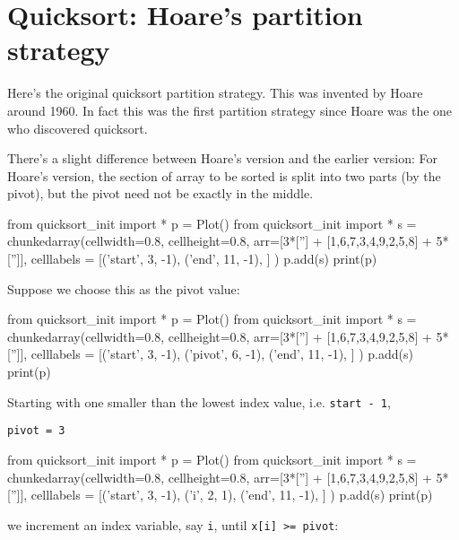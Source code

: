 \section{Quicksort: Hoare's partition strategy}

Here's the original quicksort partition strategy.
This was invented by Hoare around 1960.
In fact this was the first partition strategy since Hoare was the one
who discovered quicksort.

There's a slight difference between Hoare's version and the
earlier version:
For Hoare's version, the section of array to be sorted
is split into two parts (by the pivot),
but the pivot need not be exactly in the middle.

\begin{python}
from quicksort_init import *
p = Plot()
from quicksort_init import *
s = chunkedarray(cellwidth=0.8, 
                   cellheight=0.8,
                   arr=[3*[''] + [1,6,7,3,4,9,2,5,8] + 5*['']],
                   celllabels = [('start', 3, -1),
                                 ('end',   11, -1),
                                ]
)
p.add(s)
print(p)
\end{python}
Suppose we choose this as the pivot value:
\begin{python}
from quicksort_init import *
p = Plot()
from quicksort_init import *
s = chunkedarray(cellwidth=0.8, 
                   cellheight=0.8,
                   arr=[3*[''] + [1,6,7,3,4,9,2,5,8] + 5*['']],
                   celllabels = [('start', 3, -1),
                                  ('pivot', 6, -1),
                                 ('end',   11, -1),
                                ]
)
p.add(s)
print(p)
\end{python}

Starting with one smaller than
the lowest index value, i.e. \verb!start - 1!,

\texttt{pivot = 3}
\begin{python}
from quicksort_init import *
p = Plot()
from quicksort_init import *
s = chunkedarray(cellwidth=0.8, 
                   cellheight=0.8,
                   arr=[3*[''] + [1,6,7,3,4,9,2,5,8] + 5*['']],
                   celllabels = [('start', 3, -1),
                                 ('i', 2, 1),
                                 ('end',   11, -1),
                                ]
)
p.add(s)
print(p)
\end{python}

we increment an index variable, say \verb!i!,
until \verb!x[i] >= pivot!:

